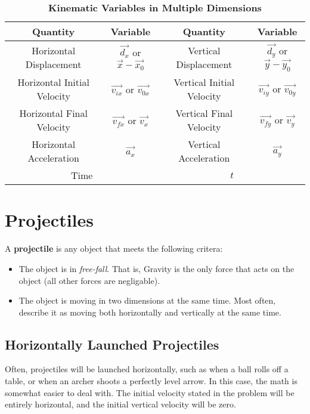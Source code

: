 	
{\renewcommand{\arraystretch}{1.2}
\begin{center}
	
	
	\begin{table}[ht]\caption{\textbf{Kinematic Variables in Multiple Dimensions}}%
		\centering %
		\begin{tabular}{|c|c||c|c|}
			\hline \hline
			\textbf{Quantity} & \textbf{Variable} & \textbf{Quantity} & \textbf{Variable}  \\
			\hline
			Horizontal Displacement & $\vec{d_x}$ or $\vec{x}-\vec{x_0}$  & Vertical Displacement & $\vec{d_y}$ or $\vec{y}-\vec{y_0}$ \\
			\hline
		
			Horizontal Initial Velocity & $\vec{v_{ix}}$ or $\vec{v_{0x}}$  & Vertical Initial Velocity & $\vec{v_{iy}}$ or $\vec{v_{0y}}$ \\
\hline

			Horizontal Final Velocity & $\vec{v_{fx}}$ or $\vec{v_x}$  & Vertical Final Velocity & $ \vec{v_{fy}}$ or $\vec{v_y}$ \\ 
	\hline
	Horizontal Acceleration & $\vec{a_x}$  &  Vertical Acceleration & $\vec{a_y} $ \\
	\hline
	\multicolumn{2}{|c|}{Time} & \multicolumn{2}{|c|}{$t$} \\
	\hline
		
		\end{tabular}
		\label{table:kinematic2d}%
	\end{table}
\end{center}

\section{Projectiles}

A \textbf{projectile} is any object that meets the following critera:
\begin{itemize}
	\item The object is in \textit{free-fall}.  That is, Gravity is the only force that acts on the object (all other forces are negligable).
	\item The object is moving in two dimensions at the same time.  Most often, describe it as moving both horizontally and vertically at the same time.  
\end{itemize}


\subsection{Horizontally Launched Projectiles}
Often, projectiles will be launched horizontally, such as when a ball rolls off a table, or when an archer shoots a perfectly level arrow.  In this case, the math is somewhat easier to deal with.  The initial velocity stated in the problem will be entirely horizontal, and the initial vertical velocity will be zero.


}
